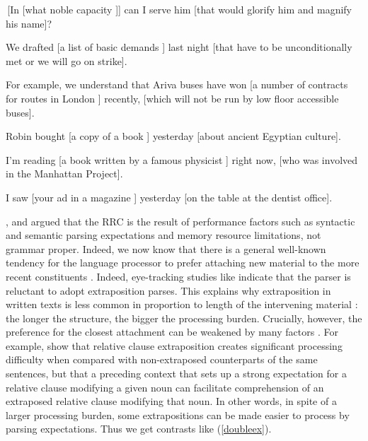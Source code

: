 \documentclass[output=paper]{langsci/langscibook}
\begin{document}
\ea 
\ea  \,[In [what noble capacity \spc]] can I serve him
[that would glorify him and magnify his name]?

\item  We drafted [a list of basic demands \spc] last night [that have
to be unconditionally met or we will  go on strike].


\item  For example, we understand that Ariva buses have won [a number
of contracts for routes in London \spc] recently,
[which will not be run by low floor accessible buses].

\item Robin bought [a copy of a book \spc] yesterday [about ancient Egyptian culture].


\item I'm reading [a book written by  a famous physicist
\spc]
right now, [who was involved in the Manhattan Project].

\item I saw [your ad in a magazine \spc] yesterday [on the table at the dentist office].
\z \label{nosubza}
\z


 \citet{grosurrc},  \citet{gazdar} and \citet{stucky} argued that the RRC is the result of
  performance  factors such as  syntactic and semantic parsing expectations and  memory resource  limitations,  not grammar proper.   Indeed, we now know that  there is a general well-known  tendency for the language processor to  prefer attaching new material
 to the more recent constituents  \citep{frazcl,gibetal,trax98,fodor02b,fernandez03}. 
Indeed, eye-tracking studies like \citet{hnps}  indicate that the
parser is reluctant to adopt  extraposition  parses.
This  explains why     extraposition in written texts
is less common in proportion to length of  the  intervening material \citep{usoepen}:
the longer the structure, the bigger the processing burden. 
 Crucially, however, the preference for the closest attachment can be weakened by
many factors \citep{fernandez03,desmet,devic,carreras}. 
For example,  \citet{levyted}  show that relative clause extraposition creates
 significant processing difficulty when compared with  non-extraposed counterparts of 
 the same sentences,   but that a preceding context that sets up a strong expectation
for a relative clause modifying a given noun can  facilitate
comprehension of an extraposed relative clause modifying that noun.
In other words, in spite of a larger processing burden,
some extrapositions can be made easier to process by parsing expectations.
Thus we get contrasts like (\ref{doubleex}).
\end{document}
